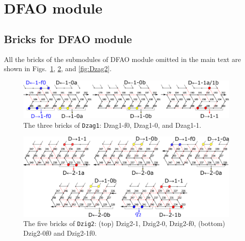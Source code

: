 \documentclass[runningheads]{llncs}
\begin{document}

\clearpage

	\section{DFAO module}
	\label{sect:appendix_DFAO_module}

	\subsection{Bricks for DFAO module}
	\label{ap_subsect:DFAO_module_bricks}

All the bricks of the submodules of DFAO module omitted in the main text are shown in Figs.~\ref{fig:Dzag1}, \ref{fig:Dzig2}, and \ref{fig:Dzag2}. 

\begin{figure}[h]
\centering
\includegraphics[width=\linewidth]{Figs/DFAO-zag1.png}
\caption{The three bricks of \texttt{Dzag1}: Dzag1-f0, Dzag1-0, and Dzag1-1.}
\label{fig:Dzag1}
\end{figure}

\begin{figure}[h]
\centering
\includegraphics[width=\linewidth]{Figs/DFAO-zig2.png}
\caption{The five bricks of \texttt{Dzig2}: (top) Dzig2-1, Dzig2-0, Dzig2-f0, (bottom) Dzig2-0f0 and Dzig2-1f0. }
\label{fig:Dzig2}
\end{figure}
\end{document}
